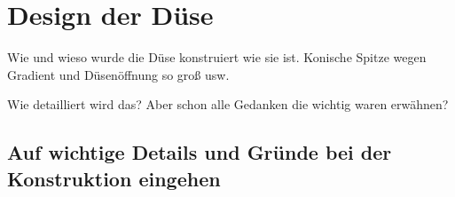 \chapter{Design der Düse} 

Wie und wieso wurde die Düse konstruiert wie sie ist. Konische Spitze wegen Gradient und Düsenöffnung so groß usw.

Wie detailliert wird das? Aber schon alle Gedanken die wichtig waren erwähnen?

\section{Auf wichtige Details und Gründe bei der Konstruktion eingehen}